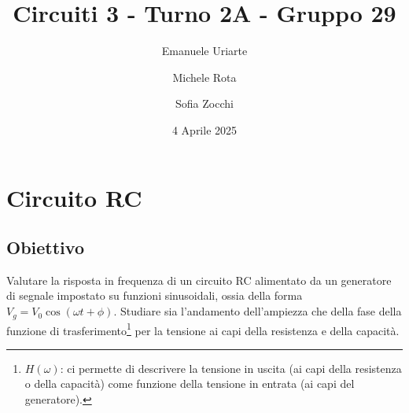 \documentclass[a4paper]{article}
\title{Circuiti 3 - Turno 2A - Gruppo 29}
\author{Emanuele Uriarte \and Michele Rota \and Sofia Zocchi}
\date{4 Aprile 2025}
\begin{document}
\maketitle

\section{Circuito RC} 
\subsection{Obiettivo}
Valutare la risposta in frequenza di un circuito RC alimentato da un generatore di segnale impostato su funzioni sinusoidali, ossia della forma 
$V_g = V_{0} \cos(\omega t + \phi)$. Studiare sia l'andamento dell'ampiezza che della fase della funzione di trasferimento\footnote{$H(\omega)$: ci permette di descrivere la tensione in uscita (ai capi della resistenza o della capacità) come funzione della tensione in entrata (ai capi del generatore).} per la tensione ai capi della resistenza e della capacità.
\end{document}
